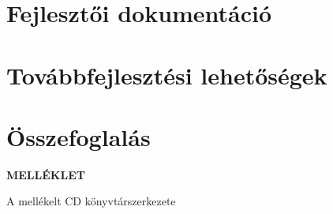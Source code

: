 \documentclass[a4paper,oneside,10pt]{report}
\begin{document}
\chapter{Fejlesztői dokumentáció}
\label{fejl}


\chapter{Továbbfejlesztési lehetőségek}
\label{tovabbfejl}


\chapter{Összefoglalás}
\label{osszefogl}














\newpage

\Large
\begin{center}
	\textbf{MELLÉKLET}
\end{center}
\normalsize
\noindent
A mellékelt CD könyvtárszerkezete
\end{document}

